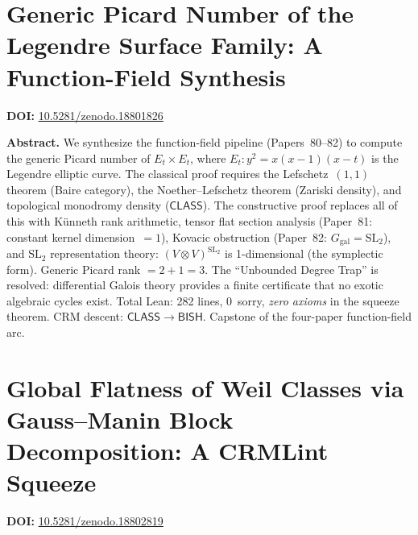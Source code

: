 \documentclass[11pt,a4paper]{article}
\begin{document}
\section{Generic Picard Number of the Legendre Surface Family: A Function-Field Synthesis}
\label{sec:p83}
\textbf{DOI:} \href{https://doi.org/10.5281/zenodo.18801826}{10.5281/zenodo.18801826}

\bigskip
\noindent\textbf{Abstract.}
We synthesize the function-field pipeline (Papers~80--82) to compute the generic Picard number of $E_t \times E_t$, where $E_t : y^2 = x(x-1)(x-t)$ is the Legendre elliptic curve. The classical proof requires the Lefschetz~$(1,1)$ theorem (Baire category), the Noether--Lefschetz theorem (Zariski density), and topological monodromy density ($\mathsf{CLASS}$). The constructive proof replaces all of this with K\"unneth rank arithmetic, tensor flat section analysis (Paper~81: constant kernel dimension~$= 1$), Kovacic obstruction (Paper~82: $G_{\mathrm{gal}} = \mathrm{SL}_2$), and $\mathrm{SL}_2$ representation theory: $(V \otimes V)^{\mathrm{SL}_2}$ is 1-dimensional (the symplectic form). Generic Picard rank $= 2 + 1 = 3$. The ``Unbounded Degree Trap'' is resolved: differential Galois theory provides a finite certificate that no exotic algebraic cycles exist. Total Lean: 282 lines, 0~sorry, \emph{zero axioms} in the squeeze theorem. CRM descent: $\mathsf{CLASS} \to \mathsf{BISH}$. Capstone of the four-paper function-field arc.

\section{Global Flatness of Weil Classes via Gauss--Manin Block Decomposition: A CRMLint Squeeze}
\label{sec:p84}
\textbf{DOI:} \href{https://doi.org/10.5281/zenodo.18802819}{10.5281/zenodo.18802819}
\end{document}
